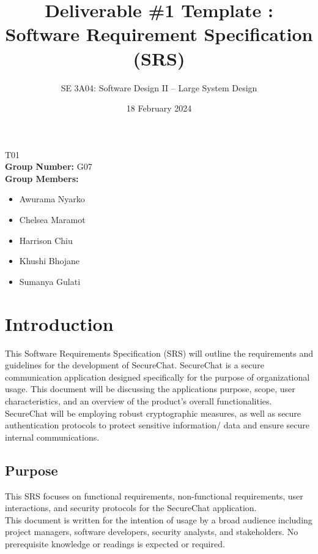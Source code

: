 \documentclass[]{article}
\title{Deliverable \#1 Template : Software Requirement Specification (SRS)}
\author{SE 3A04: Software Design II -- Large System Design}
\date{18 February 2024}
\begin{document}
\maketitle
{} T01\\
{\bf Group Number:} G07 \\
{\bf Group Members:}
\begin{itemize}
	\item Awurama Nyarko
	\item Chelsea Maramot
	\item Harrison Chiu
	\item Khushi Bhojane
	\item Sumanya Gulati
\end{itemize}

\newpage
\section{Introduction}
\label{sec:introduction}
This Software Requirements Specification (SRS) will outline the requirements and guidelines for the development of SecureChat. SecureChat is a secure communication application designed specifically for the purpose of organizational usage. This document will be discussing the applications purpose, scope, user characteristics, and an overview of the product’s overall functionalities. SecureChat will be employing robust cryptographic measures, as well as secure authentication protocols to protect sensitive information/ data and ensure secure internal communications.

\subsection{Purpose}
\label{sub:purpose}
This SRS focuses on functional requirements, non-functional requirements, user interactions, and security protocols for the SecureChat application.\\
\newline
This document is written for the intention of usage by a broad audience including project managers, software developers, security analysts, and stakeholders. No prerequisite knowledge or readings is expected or required.
\end{document}
